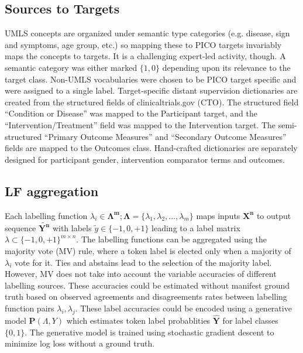 \documentclass[10.7pt,]{article}
\begin{document}
\subsection{Sources to Targets}\label{lfs}
%
UMLS concepts are organized under semantic type categories (e.g. disease, sign and symptoms, age group, etc.) so mapping these to PICO targets invariably maps the concepts to targets. 
It is a challenging expert-led activity, though.
A semantic category was either marked $\{1, 0\}$ depending upon its relevance to the target class.
Non-UMLS vocabularies were chosen to be PICO target specific and were assigned to a single label.
Target-specific distant supervision dictionaries are created from the structured fields of clinicaltrials.gov (CTO). 
The structured field ``Condition or Disease'' was mapped to the Participant target, and the ``Intervention/Treatment'' field was mapped to the Intervention target.
The semi-structured ``Primary Outcome Measures'' and ``Secondary Outcome Measures'' fields are mapped to the Outcomes class.
Hand-crafted dictionaries are separately designed for participant gender, intervention comparator terms and outcomes.

%
%
%
\subsection{LF aggregation}\label{lms}
%
Each labelling function $ \lambda_{i} \in \bm{\Lambda^{m}}; \bm{\Lambda} = \{\lambda_{1}, \lambda_{2}, \dotso, \lambda_{m} \} $ maps inputs $\bm{X^{n}}$ to output sequence $ \widetilde{\bm{Y^{n}}}$ with labels $\widetilde{y} \in \{-1, 0, +1\}$ leading to a label matrix $ \lambda \subset \{-1, 0, +1\}^{m \times n}$.
The labelling functions can be aggregated using the majority vote (MV) rule, where a token label is elected only when a majority of $\lambda_{i}$ vote for it. 
Ties and abstains lead to the selection of the majority label.
However, MV does not take into account the variable accuracies of different labelling sources.
These accuracies could be estimated without manifest ground truth based on observed agreements and disagreements rates between labelling function pairs $ \lambda_{i}, \lambda_{j}$.
These label accuracies could be encoded using a generative model $ \bm{P} ( \Lambda , Y )$ which estimates token label probablities $\bm{\hat{Y}}$ for label classes $ \{ 0, 1\} $.
The generative model is trained using stochastic gradient descent to minimize log loss without a ground truth.
%
%
%
\end{document}
